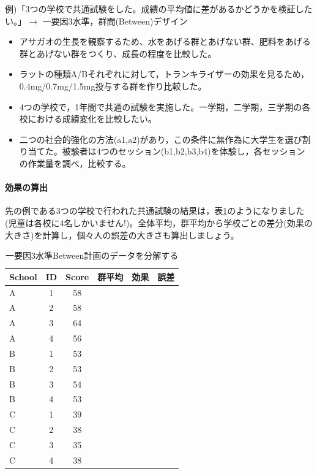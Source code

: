 \documentclass{ltjbook}
\begin{document}
例)「3つの学校で共通試験をした。成績の平均値に差があるかどうかを検証したい。」$\to$ 一要因3水準，群間(Between)デザイン

\begin{itemize}
	\item アサガオの生長を観察するため、水をあげる群とあげない群、肥料をあげる群とあげない群をつくり、成長の程度を比較した。
	\item ラットの種類A/Bそれぞれに対して，トランキライザーの効果を見るため，0.4mg/0.7mg/1.5mg投与する群を作り比較した。
	\item 4つの学校で，1年間で共通の試験を実施した。一学期，二学期，三学期の各校における成績変化を比較したい。
	\item 二つの社会的強化の方法(a1,a2)があり，この条件に無作為に大学生を選び割り当てた。被験者は4つのセッション(b1,b2,b3,b4)を体験し，各セッションの作業量を調べ，比較する。
\end{itemize}
\paragraph{効果の算出}先の例である3つの学校で行われた共通試験の結果は，表\ref{tbl:m12_example}のようになりました(児童は各校に4名しかいません!)。全体平均，群平均から学校ごとの差分(効果の大きさ)を計算し，個々人の誤差の大きさも算出しましょう。
\begin{table}[ht]
	\centering
	\caption{一要因3水準Between計画のデータを分解する}
	\begin{tabular}{lccccc}
		\hline
		School & ID & Score & 群平均 & 効果 & 誤差 \\
		\hline
		A      & 1  & 58    &     &    &    \\
		A      & 2  & 58    &     &    &    \\
		A      & 3  & 64    &     &    &    \\
		A      & 4  & 56    &     &    &    \\
		B      & 1  & 53    &     &    &    \\
		B      & 2  & 53    &     &    &    \\
		B      & 3  & 54    &     &    &    \\
		B      & 4  & 53    &     &    &    \\
		C      & 1  & 39    &     &    &    \\
		C      & 2  & 38    &     &    &    \\
		C      & 3  & 35    &     &    &    \\
		C      & 4  & 38    &     &    &    \\
		\hline
	\end{tabular}
	\label{tbl:m12_example}
\end{table}
\end{document}
